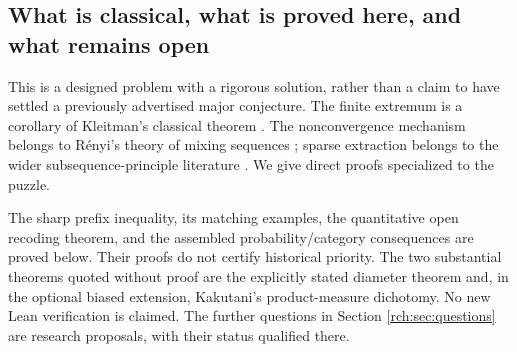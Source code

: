 \documentclass[11pt]{article}
\theoremstyle{definition}
\theoremstyle{remark}
\begin{document}
\subsection{What is classical, what is proved here, and what remains open}

This is a designed problem with a rigorous solution, rather than a claim to have
settled a previously advertised major conjecture. The finite extremum is a
corollary of Kleitman's classical theorem \cite{Kleitman,HKP}. The nonconvergence
mechanism belongs to R\'enyi's theory of mixing sequences \cite{Renyi}; sparse
extraction belongs to the wider subsequence-principle literature
\cite{Aldous,AldousEagleson}. We give direct proofs specialized to the puzzle.

The sharp prefix inequality, its matching examples, the quantitative open
recoding theorem, and the assembled probability/category consequences are
proved below. Their proofs do not certify historical priority. The two substantial
theorems quoted without proof are the explicitly stated diameter theorem and,
in the optional biased extension, Kakutani's product-measure dichotomy. No new
Lean verification is claimed. The further questions in Section
\ref{rch:sec:questions} are research proposals, with their status qualified there.
\end{document}

